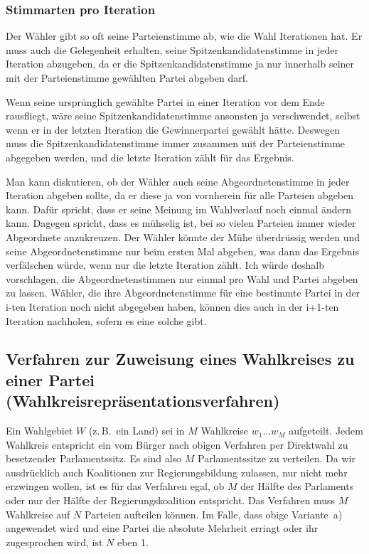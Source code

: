 \subsubsection{Stimmarten pro Iteration}

Der Wähler gibt so oft seine Parteienstimme ab, wie die Wahl Iterationen hat.
Er muss auch die Gelegenheit erhalten, seine Spitzenkandidatenstimme in jeder Iteration abzugeben, da er die Spitzenkandidatenstimme ja nur innerhalb seiner mit der Parteienstimme gewählten Partei abgeben darf.

Wenn seine ursprünglich gewählte Partei in einer Iteration vor dem Ende rausfliegt, wäre seine Spitzenkandidatenstimme ansonsten ja verschwendet, selbst wenn er in der letzten Iteration die Gewinnerpartei gewählt hätte.
Deswegen muss die Spitzenkandidatenstimme immer zusammen mit der Parteienstimme abgegeben werden, und die letzte Iteration zählt für das Ergebnis.

Man kann diskutieren, ob der Wähler auch seine Abgeordnetenstimme in jeder Iteration abgeben sollte, da er diese ja von vornherein für alle Parteien abgeben kann.
Dafür spricht, dass er seine Meinung im Wahlverlauf noch einmal ändern kann.
Dagegen spricht, dass es mühselig ist, bei so vielen Parteien immer wieder Abgeordnete anzukreuzen.
Der Wähler könnte der Mühe überdrüssig werden und seine Abgeordnetenstimme nur beim ersten Mal abgeben, was dann das Ergebnis verfälschen würde, wenn nur die letzte Iteration zählt.
Ich würde deshalb vorschlagen, die Abgeordnetenstimmen nur einmal pro Wahl und Partei abgeben zu lassen.
Wähler, die ihre Abgeordnetenstimme für eine bestimmte Partei in der i-ten Iteration noch nicht abgegeben haben, können dies auch in der i+1-ten Iteration nachholen, sofern es eine solche gibt.

\subsection{Verfahren zur Zuweisung eines Wahlkreises zu einer Partei
  (Wahlkreisrepräsentationsverfahren)}

Ein Wahlgebiet $W$ (z.\,B.\ ein Land) sei in $M$ Wahlkreise $w_1 \ldots w_M$ aufgeteilt. Jedem
Wahlkreis entspricht ein vom Bürger nach obigen Verfahren per Direktwahl zu besetzender
Parlamentssitz. Es sind also $M$ Parlamentssitze zu verteilen. Da wir ausdrücklich auch
Koalitionen zur Regierungsbildung zulassen, nur nicht mehr erzwingen wollen, ist es für das
Verfahren egal, ob $M$ der Hälfte des Parlaments oder nur der Hälfte der Regierungskoalition
entspricht. Das Verfahren muss $M$ Wahlkreise auf $N$ Parteien aufteilen können. Im Falle, dass
obige Variante~a) angewendet wird und eine Partei die absolute Mehrheit erringt oder ihr
zugesprochen wird, ist $N$ eben 1.

